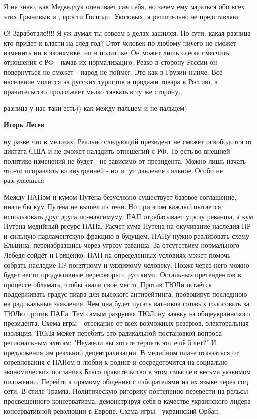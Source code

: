 \begin{itemize}
Я не знаю, как Медведчук оценивает сам себя, но зачем ему мараться обо всех
этих Грынивыв и , прости Господи, Уколовых, я решительно не представляю.


О! Заработало!!!! Я уж думал ты совсем в делах зашился. По сути: какая разница
кто придет к власти на след год? Этот человек по любому ничего не сможет
изменить ни в экономике, ни в политике. Он может лишь слегка смягчить отношения
с РФ - начав их нормализацию. Резко в сторону России он повернуться не сможет -
народ не поймет. Это как в Грузии нынче. Всё население молится на русских
туристов и продажи товара в Россию, а правительство продолжает мелко тявкать в
ту же сторону.

\begin{itemize} %
разница у нас таки есть)) как между пальцем и не пальцем)

\textbf{Игорь Лесев} 

ну разве что в мелочах. Реально следующий президент не сможет освободится от
диктата США и не сможет наладить отношений с РФ. То есть во внешней политике
изменений не будет - не зависимо от президента. Можно лишь начать что-то
исправлять во внутренней - но и тут давление сильное. Особо не разгуляешься

\end{itemize} %


Между ПАПом и кумом Путена безусловно существует базовое соглашение, иначе бы
кум Путена не вышел из тени. Но при этом каждый пытается использовать друг
друга по-максимуму. ПАП отрабатывает угрозу реванша, а кум Путена медийный
ресурс ПАПа. Расчет кума Путена на окучивание наследия ПР и сильную
парламентскую фракцию в будущем. ПАПу нужно реализовать схему Ельцина,
переизбравшись через угрозу реванша. За отсутствием нормального Лебедя сойдёт и
Гриценко. ПАП на определенных условиях может помочь собрать наследие ПР
понятному и уязвимому человеку. Позже через него можно будет вести продуктивные
переговоры с русскими. Остальных претендентов в процессе обламать, чтобы знали
своё место. Против ТЮЛи остаётся поддерживать градус пиара для высокого
антирейтинга, провоцируя последнюю на радикальные заявления. Чем она будет
пугать ватников готовых голосовать за ТЮЛю против ПАПа. Тем самым разрушая
ТЮЛину заявку на общеукраинского президента. Схема игры - отсекание от всех
возможных резервов, электоральная изоляция. ТЮЛя может перебить это радикальной
постановкой вопроса региональным элитам: "Неужели вы хотите терпеть это ещё 5
лет?" И предложения им реальной децентрализации. В медийном плане отказаться от
соревнования с ПАПом в любви к родине и сосредоточится на
социально-экономических посланиях.Благо правительство в этом смысле в весьма
уязвимом положении. Перейти к прямому общению с избирателями на их языке через
соц. сети. В стиле Трампа. Политическую риторику постепенно перевести на рельсы
просвещенного консерватизма, демонстрируя себя в качестве украинского лидера
консервативной революции в Европе. Схема игры - украинский Орбан.


\end{itemize}
